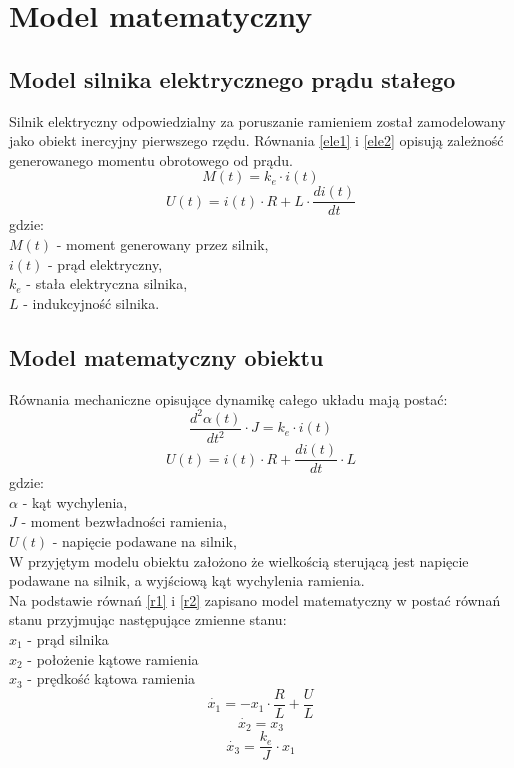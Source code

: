 \chapter{Model matematyczny}

\section{Model silnika elektrycznego prądu stałego}
Silnik elektryczny odpowiedzialny za poruszanie ramieniem został zamodelowany jako obiekt inercyjny pierwszego rzędu. Równania \ref{ele1} i \ref{ele2} opisują zależność generowanego momentu obrotowego od prądu.
\begin{equation}\label{ele1}
M(t) = k_e \cdot i(t)
\end{equation}
\begin{equation}\label{ele2}
U(t) = i(t) \cdot R + L \cdot \frac{di(t)}{dt}
\end{equation}
gdzie:\\
$M(t)$ - moment generowany przez silnik,\\
$i(t)$ - prąd elektryczny,\\
$k_e$ - stała elektryczna silnika,\\
$L$ - indukcyjność silnika.\\
%
\section{Model matematyczny obiektu}
Równania mechaniczne opisujące dynamikę całego układu mają postać:\\
\begin{equation}\label{r1}
\frac{d^2 \alpha(t)}{dt^2} \cdot J = k_e \cdot i(t) 
\end{equation}
\begin{equation}\label{r2}
U(t) = i(t) \cdot R + \frac{d i(t)}{dt} \cdot L
\end{equation}
gdzie:\\
$\alpha$ - kąt wychylenia,\\
$J$ - moment bezwładności ramienia,\\
$U(t)$ - napięcie podawane na silnik,\\

W przyjętym modelu obiektu założono że wielkością sterującą jest napięcie podawane na silnik, a wyjściową kąt wychylenia ramienia.\\
Na podstawie równań \ref{r1} i \ref{r2} zapisano model matematyczny w postać równań stanu przyjmując następujące zmienne stanu:\\
$x_1$ - prąd silnika\\
$x_2$ -  położenie kątowe ramienia\\
$x_3$ - prędkość kątowa ramienia\\
\begin{equation}\label{key}
\dot {x_1} = -x_1  \cdot \frac{R}{L} + \frac{U}{L}
\end{equation}
\begin{equation}\label{key}
\dot {x_2} = x_3
\end{equation}
\begin{equation}\label{key}
\dot {x_3} = \frac{k_e}{J} \cdot x_1
\end{equation}
